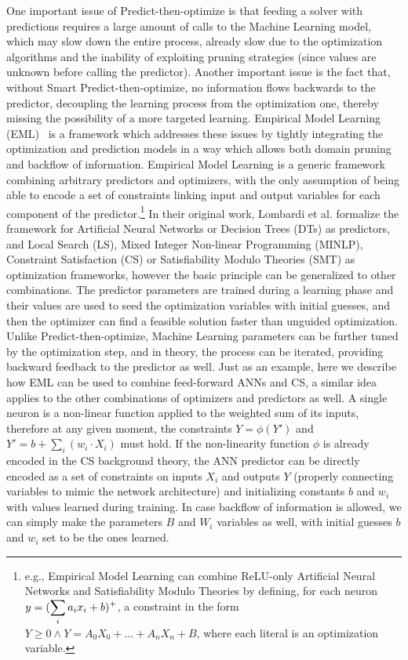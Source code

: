 One important issue of Predict-then-optimize is that feeding a solver with predictions requires a large amount of calls to the Machine Learning model, which may slow down the entire process, already slow due to the optimization algorithms and the inability of exploiting pruning strategies (since values are unknown before calling the predictor). Another important issue is the fact that, without Smart Predict-then-optimize, no information flows backwards to the predictor, decoupling the learning process from the optimization one, thereby missing the possibility of a more targeted learning.
Empirical Model Learning (EML)~\cite{lombardi2017empirical} is a framework which addresses these issues by tightly integrating the optimization and prediction models in a way which allows both domain pruning and backflow of information.
Empirical Model Learning is a generic framework combining arbitrary predictors and optimizers, with the only assumption of being able to encode a set of constraints linking input and output variables for each component of the predictor.\footnote{e.g., Empirical Model Learning can combine ReLU-only Artificial Neural Networks and Satisfiability Modulo Theories by defining, for each neuron $y = (\displaystyle\sum_i {a}_i {x}_i + b)^+$, a constraint in the form $Y \geq 0 \wedge Y = A_0 X_0 + \dots + A_n X_n + B$, where each literal is an optimization variable.}
%
In their original work, Lombardi et al. formalize the framework for Artificial Neural Networks or Decision Trees (DTs) as predictors, and Local Search (LS), Mixed Integer Non-linear Programming (MINLP), Constraint Satisfaction (CS) or Satisfiability Modulo Theories (SMT) as optimization frameworks, however the basic principle can be generalized to other combinations.
The predictor parameters are trained during a learning phase and their values are used to seed the optimization variables with initial guesses, and then the optimizer can find a feasible solution faster than unguided optimization. Unlike Predict-then-optimize, Machine Learning parameters can be further tuned by the optimization step, and in theory, the process can be iterated, providing backward feedback to the predictor as well.
\iffalse
Just as an example, here we describe how EML can be used to combine feed-forward ANNs and CS, a similar idea applies to the other combinations of optimizers and predictors as well. A single neuron is a non-linear function applied to the weighted sum of its inputs, therefore at any given moment, the constraints $Y = \phi(Y')$ and $Y' = b + \displaystyle\sum_{i}(w_i \cdot X_i)$ must hold. If the non-linearity function $\phi$ is already encoded in the CS background theory, the ANN predictor can be directly encoded as a set of constraints on inputs $X_i$ and outputs $Y$ (properly connecting variables to mimic the network architecture) and initializing constants $b$ and $w_i$ with values learned during training. In case backflow of information is allowed, we can simply make the parameters $B$ and $W_i$ variables as well, with initial guesses $b$ and $w_i$ set to be the ones learned.
